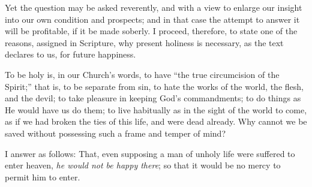 Yet the question may be asked reverently, and with a
view to enlarge our insight into our own condition and
prospects; and in that case the attempt to answer it will
be profitable, if it be made soberly. I proceed,
therefore, to state one of the reasons, assigned in
Scripture, why present holiness is necessary, as the text
declares to us, for future happiness.

To be holy is, in our Church's words, to have
``the true circumcision of the Spirit;'' that is,
to be separate from sin, to hate the works of the world,
the flesh, and the devil; to take pleasure in keeping
God's commandments; to do things as He would have us do
them; to live habitually as in the sight of the world to
come, as if we had broken the ties of this life, and were
dead already. Why cannot we be saved without possessing
such a frame and temper of mind?

I answer as follows: That, even supposing a man of
unholy life were suffered to enter heaven, \emph{he would
not be happy there}; so that it would be no mercy to
permit him to enter.

